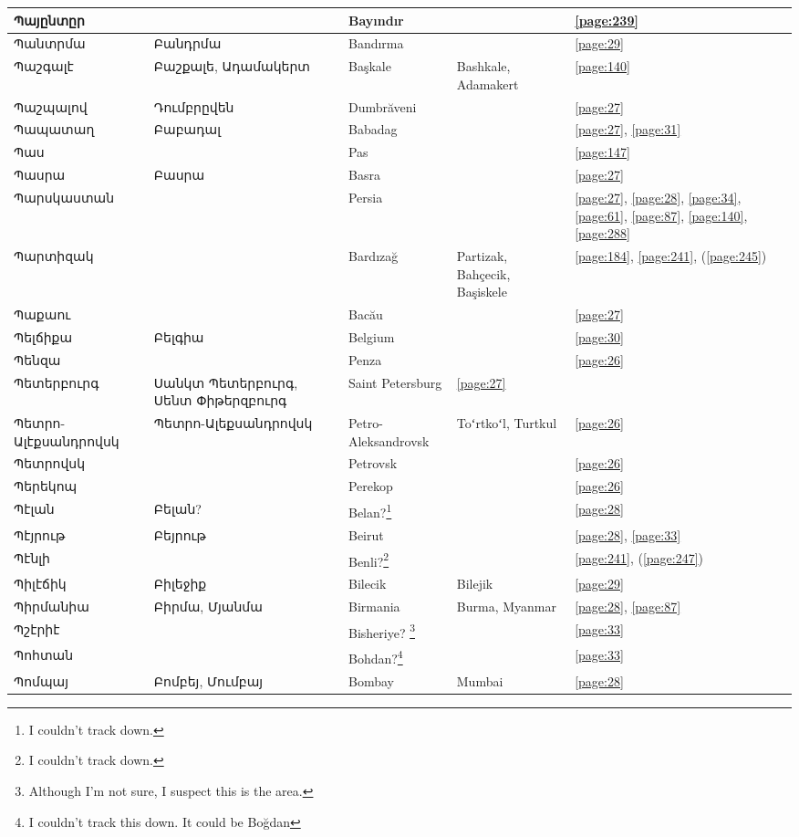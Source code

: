 \begin{center}
\begin{longtable}{|p{}|p{3cm}|p{3cm}|p{2cm}|p{3cm}|}
Պայընտըր& &Bayındır & &\ref{page:239}\\ \hline
Պանտրմա& Բանդրմա&Bandırma & &\ref{page:29}\\ \hline
Պաշգալէ& Բաշքալե,  Ադամակերտ & Başkale& Bashkale, Adamakert&\ref{page:140}\\ \hline
Պաշպալով& Դումբրըվեն & Dumbrăveni& &\ref{page:27}\\ \hline
Պապատաղ&Բաբադալ &Babadag & &\ref{page:27}, \ref{page:31}\\ \hline
Պաս& & Pas& &\ref{page:147}\\ \hline
Պասրա& Բասրա& Basra& &\ref{page:27}\\ \hline
Պարսկաստան& & 
Persia& &\ref{page:27}, \ref{page:28}, \ref{page:34}, \ref{page:61}, \ref{page:87}, \ref{page:140}, \ref{page:288}\\ \hline
Պարտիզակ& & Bardızağ&Partizak, Bahçecik, Başiskele   &\ref{page:184}, \ref{page:241}, (\ref{page:245})\\ \hline
Պաքաու& &Bacău & &\ref{page:27}\\ \hline
Պելճիքա&Բելգիա &Belgium & &\ref{page:30}\\ \hline
Պենզա& &Penza& &\ref{page:26}\\ \hline
Պետերբուրգ& Սանկտ Պետերբուրգ, Սենտ Փիթերզբուրգ &   Saint Petersburg  &\ref{page:27}\\ \hline
Պետրո-Ալէքսանդրովսկ&Պետրո-Ալեքսանդրովսկ & Petro-Aleksandrovsk&Toʻrtkoʻl, Turtkul &\ref{page:26}\\ \hline
Պետրովսկ& & Petrovsk& &\ref{page:26}\\ \hline
Պերեկոպ& &Perekop & &\ref{page:26}\\ \hline
Պէլան& Բելան?& Belan?\footnote{I couldn't track down. }& &\ref{page:28}\\ \hline
Պէյրութ&   Բեյրութ&Beirut & &\ref{page:28}, \ref{page:33}\\ \hline
Պէնլի& &Benli?\footnote{I couldn't track down.} & &\ref{page:241}, (\ref{page:247})\\ \hline
Պիլէճիկ&Բիլեջիք& Bilecik&Bilejik &\ref{page:29}\\ \hline
Պիրմանիա& Բիրմա, Մյանմա  &Birmania  &Burma, Myanmar &\ref{page:28}, \ref{page:87}\\ \hline
Պշէրիէ& &Bisheriye? \footnote{Although I'm not sure, I suspect this is the area.} & &\ref{page:33}\\ \hline
Պոհտան& &Bohdan?\footnote{I couldn't track this down. It could be Boğdan} & &\ref{page:33}\\ \hline
Պոմպայ& Բոմբեյ, Մումբայ&      Bombay  &Mumbai &\ref{page:28}\\ \hline

\end{longtable}
\end{center}
